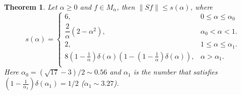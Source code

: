 \documentclass[reqno]{amsart}
\theoremstyle{plain}
\newtheorem{theo}{Theorem}[section]
\theoremstyle{definition}
\begin{document}
\begin{theo} Let $\alpha\geq 0$ and $f\in M_\alpha$, then $\|Sf\|\leq s(\alpha)$, where
\begin{equation}\label{def-s} s(\alpha)=\left\{\begin{array}{lr}6, & 0\leq \alpha\leq \alpha_0\\[0.3cm]
\dfrac2\alpha\left(2-\alpha^2\right), & \alpha_0<\alpha<1.\\[0.3cm]
2, & 1\leq \alpha\leq \alpha_1.\\[0.3cm]
8\left(1-\frac1\alpha\right)\delta(\alpha)\left(1-\left(1-\frac1\alpha\right)\delta(\alpha)\right), & \alpha>\alpha_1.\\[0.3cm]
\end{array}\right.\end{equation}
Here $\alpha_0=(\sqrt{17}-3)/2\sim 0.56$ and $\alpha_1$ is the number that satisfies $\left(1-\frac{1}{\alpha_1}\right)\delta(\alpha_1)=1/2$ ($\alpha_1\sim 3.27$).
\end{theo}
\end{document}
